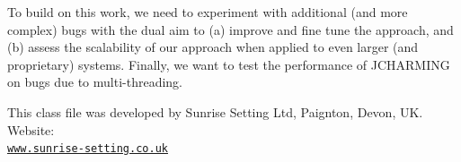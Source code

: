 \documentclass[times]{smrauth}
\begin{document}
To build on this work, we need to experiment with additional
(and more complex) bugs with the dual aim to (a) improve and
fine tune the approach, and (b) assess the scalability of our
approach when applied to even larger (and proprietary)
systems. Finally, we want to test the performance of
JCHARMING on bugs due to multi-threading.

\ack This class file was developed by Sunrise Setting Ltd,
Paignton, Devon, UK. Website:\\
\href{http://www.sunrise-setting.co.uk}{\texttt{www.sunrise-setting.co.uk}}



\end{document}
